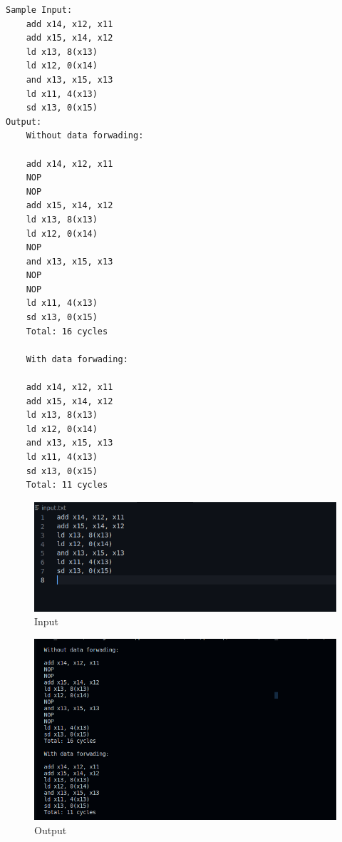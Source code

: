 \documentclass{article}
\begin{document}
\begin{verbatim}
Sample Input:
    add x14, x12, x11
    add x15, x14, x12
    ld x13, 8(x13)
    ld x12, 0(x14)
    and x13, x15, x13
    ld x11, 4(x13)
    sd x13, 0(x15)
Output:
    Without data forwading: 

    add x14, x12, x11
    NOP
    NOP
    add x15, x14, x12
    ld x13, 8(x13)
    ld x12, 0(x14)
    NOP
    and x13, x15, x13
    NOP
    NOP
    ld x11, 4(x13)
    sd x13, 0(x15)
    Total: 16 cycles

    With data forwading: 

    add x14, x12, x11
    add x15, x14, x12
    ld x13, 8(x13)
    ld x12, 0(x14)
    and x13, x15, x13
    ld x11, 4(x13)
    sd x13, 0(x15)
    Total: 11 cycles

\end{verbatim}
\begin{figure}[H]{\centering}
    \includegraphics[width=\textwidth]{input.png}
    \caption[short]{Input}
\end{figure}
\begin{figure}[H]
    \includegraphics[width=\textwidth]{output.png}
    \caption[short]{Output}
\end{figure}
\end{document}
